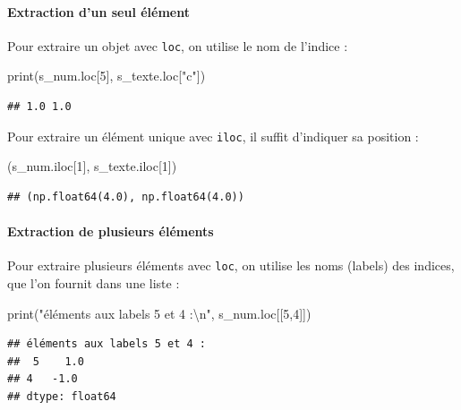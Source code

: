 \documentclass[
  12pt,
]{book}
\newenvironment{Shaded}{\begin{snugshade}}{\end{snugshade}}
\newcommand{\BuiltInTok}[1]{#1}
\newcommand{\CharTok}[1]{\textcolor[rgb]{0.31,0.60,0.02}{#1}}
\newcommand{\DecValTok}[1]{\textcolor[rgb]{0.00,0.00,0.81}{#1}}
\newcommand{\NormalTok}[1]{#1}
\newcommand{\StringTok}[1]{\textcolor[rgb]{0.31,0.60,0.02}{#1}}
\numberwithin{equation}{section}
\numberwithin{countremarque}{section}
\begin{document}
\paragraph{Extraction d'un seul élément}\label{extraction-dun-seul-uxe9luxe9ment}

Pour extraire un objet avec \texttt{loc}, on utilise le nom de l'indice :

\begin{Shaded}
\begin{Highlighting}[]
\BuiltInTok{print}\NormalTok{(s\_num.loc[}\DecValTok{5}\NormalTok{], s\_texte.loc[}\StringTok{"c"}\NormalTok{])}
\end{Highlighting}
\end{Shaded}

\begin{lstlisting}
## 1.0 1.0
\end{lstlisting}

Pour extraire un élément unique avec \texttt{iloc}, il suffit d'indiquer sa position :

\begin{Shaded}
\begin{Highlighting}[]
\NormalTok{(s\_num.iloc[}\DecValTok{1}\NormalTok{], s\_texte.iloc[}\DecValTok{1}\NormalTok{])}
\end{Highlighting}
\end{Shaded}

\begin{lstlisting}
## (np.float64(4.0), np.float64(4.0))
\end{lstlisting}

\paragraph{Extraction de plusieurs éléments}\label{extraction-de-plusieurs-uxe9luxe9ments}

Pour extraire plusieurs éléments avec \texttt{loc}, on utilise les noms (labels) des indices, que l'on fournit dans une liste :

\begin{Shaded}
\begin{Highlighting}[]
\BuiltInTok{print}\NormalTok{(}\StringTok{"éléments aux labels 5 et 4 :}\CharTok{\textbackslash{}n}\StringTok{"}\NormalTok{, s\_num.loc[[}\DecValTok{5}\NormalTok{,}\DecValTok{4}\NormalTok{]])}
\end{Highlighting}
\end{Shaded}

\begin{lstlisting}
## éléments aux labels 5 et 4 :
##  5    1.0
## 4   -1.0
## dtype: float64
\end{lstlisting}
\end{document}
